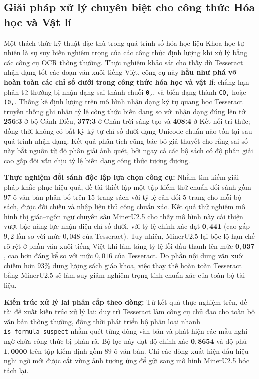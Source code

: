 \subsection{Giải pháp xử lý chuyên biệt cho công thức Hóa học và Vật lí}
\label{sec:formula_hybrid}
Một thách thức kỹ thuật đặc thù trong quá trình số hóa học liệu Khoa học tự nhiên là sự suy biến nghiêm trọng của các công thức định lượng khi xử lý bằng các công cụ OCR thông thường. Thực nghiệm khảo sát cho thấy dù Tesseract nhận dạng tốt các đoạn văn xuôi tiếng Việt, công cụ này \textbf{hầu như phá vỡ hoàn toàn các chỉ số dưới trong công thức hóa học và vật lí}: chẳng hạn phân tử  thường bị nhận dạng sai thành chuỗi \texttt{0,}, và  biến dạng thành \texttt{CO,} hoặc \texttt{(0,}. Thống kê định lượng trên mô hình nhận dạng ký tự quang học Tesseract truyền thống ghi nhận tỷ lệ công thức biến dạng so với nhận dạng đúng lên tới \textbf{256:3} ở bộ Cánh Diều, \textbf{377:3} ở Chân trời sáng tạo và \textbf{408:4} ở Kết nối tri thức; đồng thời không có bất kỳ ký tự chỉ số dưới dạng Unicode chuẩn nào tồn tại sau quá trình nhận dạng. Kết quả phân tích cũng bác bỏ giả thuyết cho rằng sai số này bắt nguồn từ độ phân giải ảnh quét, bởi ngay cả các bộ sách có độ phân giải cao gấp đôi vẫn chịu tỷ lệ biến dạng công thức tương đương.

\textbf{Thực nghiệm đối sánh độc lập lựa chọn công cụ:} Nhằm tìm kiếm giải pháp khắc phục hiệu quả, đề tài thiết lập một tập kiểm thử chuẩn đối sánh gồm $97$ ô văn bản phân bố trên $15$ trang sách với tỷ lệ cân đối $5$ trang cho mỗi bộ sách, được đối chiếu và nhập liệu thủ công chuẩn xác. Kết quả thử nghiệm mô hình thị giác--ngôn ngữ chuyên sâu MinerU2.5 cho thấy mô hình này cải thiện vượt bậc năng lực nhận diện chỉ số dưới, với tỷ lệ chính xác đạt $\mathbf{0{,}441}$ (cao gấp $9{,}2$ lần so với mức $0{,}048$ của Tesseract). Tuy nhiên, MinerU2.5 lại bộc lộ hạn chế rõ rệt ở phần văn xuôi tiếng Việt khi làm tăng tỷ lệ lỗi dấu thanh lên mức $\mathbf{0{,}037}$, cao hơn đáng kể so với mức $0{,}016$ của Tesseract. Do phần nội dung văn xuôi chiếm hơn $93\%$ dung lượng sách giáo khoa, việc thay thế hoàn toàn Tesseract bằng MinerU2.5 sẽ làm suy giảm nghiêm trọng tính chuẩn xác của toàn bộ tài liệu.

\textbf{Kiến trúc xử lý lai phân cấp theo dòng:} Từ kết quả thực nghiệm trên, đề tài đề xuất kiến trúc xử lý lai: duy trì Tesseract làm công cụ chủ đạo cho toàn bộ văn bản thông thường, đồng thời phát triển bộ phân loại nhanh \texttt{is\_formula\_suspect} nhằm quét từng dòng văn bản và phát hiện các mẫu nghi ngờ chứa công thức bị phân rã. Bộ lọc này đạt độ chính xác $\mathbf{0{,}8654}$ và độ phủ $\mathbf{1{,}0000}$ trên tập kiểm định gồm $89$ ô văn bản. Chỉ các dòng xuất hiện dấu hiệu nghi ngờ mới được cắt vùng ảnh tương ứng để gửi sang mô hình MinerU2.5 bóc tách lại.

